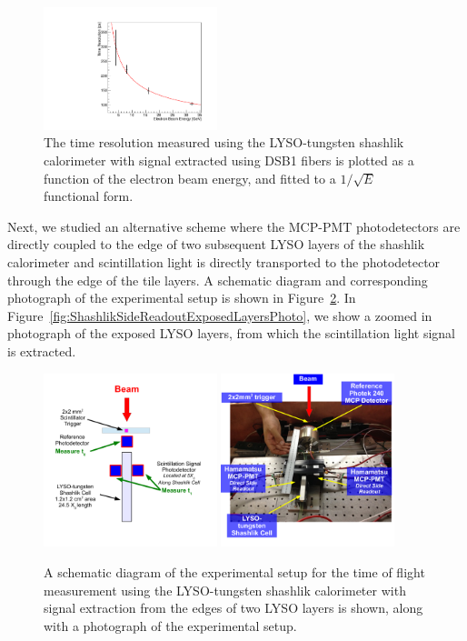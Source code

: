 \documentclass[12pt]{article}
\begin{document}
\begin{figure}[H] \centering
\includegraphics[width=0.45\textwidth]{figs/TimeResolutionVsEnergy_ShashlikDSB1Fiber} 
\caption{ The time resolution measured using the LYSO-tungsten shashlik
calorimeter with signal extracted using DSB1 fibers is plotted as a function of
the electron beam energy, and fitted to a $1/\sqrt{E}$ functional form. }
\label{fig:ShashlikFiberTOFResolutionVsEnergy}
\end{figure}


Next, we studied an alternative scheme where the MCP-PMT photodetectors
are directly coupled to the edge of two subsequent LYSO layers of the
shashlik calorimeter and scintillation light is directly transported 
to the photodetector through the edge of the tile layers. 
A schematic diagram and corresponding photograph of
the experimental setup is shown in Figure~\ref{fig:ShashlikSideReadoutSetup}.
In Figure~\ref{fig:ShashlikSideReadoutExposedLayersPhoto}, we show
a zoomed in photograph of the exposed LYSO layers, from which the 
scintillation light signal is extracted.

\begin{figure}[H] \centering
\includegraphics[width=0.45\textwidth]{figs/ShashlikSideReadoutSetupSchematic} 
\includegraphics[width=0.45\textwidth]{figs/ShashlikSideReadoutPhotoB} 
\caption{ A schematic diagram of the experimental setup for the
time of flight measurement using the LYSO-tungsten shashlik calorimeter
with signal extraction from the edges of two LYSO layers is shown, along
with a photograph of the experimental setup. } 
\label{fig:ShashlikSideReadoutSetup}
\end{figure}
\end{document}
